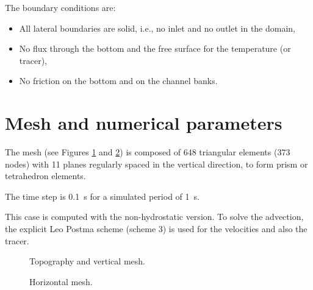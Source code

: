 \bigskip
The boundary conditions are:
\begin{itemize}
\item All lateral boundaries are solid, i.e., no inlet and no outlet in the domain,
\item No flux through the bottom and the free surface for the temperature (or tracer),
\item No friction on the bottom and on the channel banks.
\end{itemize}

\section{Mesh and numerical parameters}
\bigskip
The mesh (see Figures \ref{t3d:V:fig:meshV} and \ref{t3d:V:fig:meshH}) 
is composed of 648 triangular elements (373 nodes) with 11 planes regularly 
spaced in the vertical direction, to form prism or tetrahedron elements.

\bigskip
The time step is 0.1~s for a simulated period of 1~s.

\bigskip
This case is computed with the non-hydrostatic version. To solve the advection, 
the explicit Leo Postma scheme (scheme 3) is used for the velocities and also the tracer.

\begin{figure}[!htbp]
 \centering
 \caption{Topography and vertical mesh.}
 \label{t3d:V:fig:meshV}
\end{figure}
\begin{figure}[!htbp]
 \centering
 \caption{Horizontal mesh.}
 \label{t3d:V:fig:meshH}
\end{figure}

%
